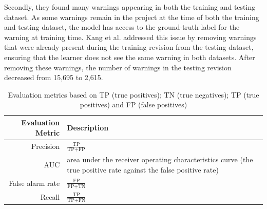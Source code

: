 Secondly, they found many warnings appearing in both the training and testing dataset. 
As some warnings remain in the project at the time of both the training and testing dataset, the model has access to the ground-truth label for the warning at training time.
Kang et al. addressed this issue by removing warnings that were already present during the training revision from the testing dataset, ensuring that the learner does not see the same warning in both datasets.
After removing these warnings, the number of warnings in the testing revision decreased from
15,695 to 2,615.


\begin{table}[t]
    \centering
    \caption{Evaluation metrics based on TP (true positives); TN (true negatives);
    TP (true positives) and FP (false positives)}
    \label{tab:metrics}
    \begin{tabular}{rp{5cm}}
        \toprule
        \textbf{Evaluation Metric} & \textbf{Description}  \\
        \midrule
        Precision & $\frac{\text { TP } }{\text {TP}+\text {FP}}$ \\ 
    
        AUC  & area under the receiver operating
characteristics curve (the true positive
rate against the false positive rate) \\ 
   
        False alarm rate & $\frac{\text { FP } }{\text {FP}+\text {TN}}$\\
      
        Recall &  $\frac{\text { TP } }{\text {TP}+\text {FN}}$ \\
        \bottomrule
    \end{tabular}
\end{table}


